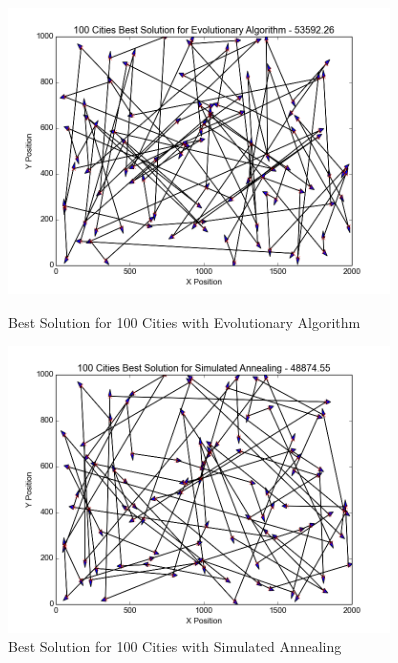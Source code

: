
\begin{figure}[H]
	\centering
    \begin{minipage}{0.45\textwidth}
        \centering
        \includegraphics[width=0.9\textwidth]{100City_EA.png} %
        \caption{Best Solution for 100 Cities with Evolutionary Algorithm}
        \label{fig:100city_EA}
    \end{minipage}\hfill
    \begin{minipage}{0.45\textwidth}
        \centering
        \includegraphics[width=0.9\textwidth]{100City_SA.png} %
        \caption{Best Solution for 100 Cities with Simulated Annealing}
        \label{fig:100city_SA}
    \end{minipage}\hfill
    \begin{minipage}{0.45\textwidth}

\end{minipage}
\end{figure}
